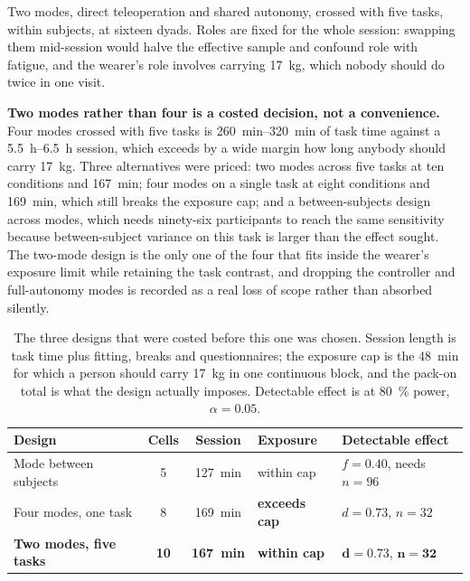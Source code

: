 Two modes, direct teleoperation and shared autonomy, crossed with five tasks,
within subjects, at sixteen dyads. Roles are fixed for the whole session:
swapping them mid-session would halve the effective sample and confound role
with fatigue, and the wearer's role involves carrying \SI{17}{\kilo\gram},
which nobody should do twice in one visit.

\textbf{Two modes rather than four is a costed decision, not a convenience.}
Four modes crossed with five tasks is \SIrange{260}{320}{\minute} of task time
against a \SIrange{5.5}{6.5}{\hour} session, which exceeds by a wide margin
how long anybody should carry \SI{17}{\kilo\gram}. Three alternatives were
priced: two modes across five tasks at ten conditions and
\SI{167}{\minute}; four modes on a single task at eight conditions and
\SI{169}{\minute}, which still breaks the exposure cap; and a
between-subjects design across modes, which needs ninety-six participants to
reach the same sensitivity because between-subject variance on this task is
larger than the effect sought. The two-mode design is the only one of the four
that fits inside the wearer's exposure limit while retaining the task
contrast, and dropping the controller and full-autonomy modes is recorded as a
real loss of scope rather than absorbed silently.

\begin{table}[htbp]
  \centering
  \caption[Design options costed before the study was fixed]{The three
  designs that were costed before this one was chosen. Session length is task
  time plus fitting, breaks and questionnaires; the exposure cap is the
  \SI{48}{\minute} for which a person should carry \SI{17}{\kilo\gram} in one
  continuous block, and the pack-on total is what the design actually
  imposes. Detectable effect is at \SI{80}{\percent} power, $\alpha=0.05$.}
  \label{tab:design-options}
  \small
  \begin{tabular}{@{}lccll@{}}
    \toprule
    Design & Cells & Session & Exposure & Detectable effect \\
    \midrule
    Mode between subjects & 5 & \SI{127}{\minute} & within cap
      & $f = 0.40$, needs $n = 96$ \\
    Four modes, one task & 8 & \SI{169}{\minute} & \textbf{exceeds cap}
      & $d = 0.73$, $n = 32$ \\
    \textbf{Two modes, five tasks} & \textbf{10} & \textbf{\SI{167}{\minute}}
      & \textbf{within cap} & $\mathbf{d = 0.73}$, $\mathbf{n = 32}$ \\
    \bottomrule
  \end{tabular}
\end{table}

